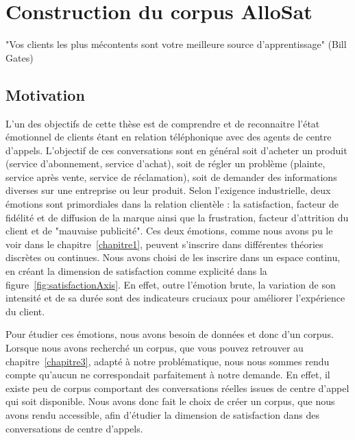 \chapter{Construction du corpus AlloSat}
\label{chapitre4}
"Vos clients les plus mécontents sont votre meilleure source d’apprentissage" (Bill Gates)

\section{Motivation}
L'un des objectifs de cette thèse est de comprendre et de reconnaitre l'état émotionnel de clients étant en relation téléphonique avec des agents de centre d'appels. L'objectif de ces conversations sont en général soit d'acheter un produit (service d'abonnement, service d'achat), soit de régler un problème (plainte, service après vente, service de réclamation), soit de demander des informations diverses sur une entreprise ou leur produit. Selon l'exigence industrielle, deux émotions sont primordiales dans la relation clientèle : la satisfaction, facteur de fidélité et de diffusion de la marque ainsi que la frustration, facteur d'attrition du client et de "mauvaise publicité". Ces deux émotions, comme nous avons pu le voir dans le chapitre~\ref{chapitre1}, peuvent s'inscrire dans différentes théories discrètes ou continues.
Nous avons choisi de les inscrire dans un espace continu, en créant la dimension de satisfaction comme explicité dans la figure~\ref{fig:satisfactionAxis}. En effet, outre l'émotion brute, la variation de son intensité et de sa durée sont des indicateurs cruciaux pour améliorer l'expérience du client.

Pour étudier ces émotions, nous avons besoin de données et donc d'un corpus.
Lorsque nous avons recherché un corpus, que vous pouvez retrouver au chapitre~\ref{chapitre3}, adapté à notre problématique, nous nous sommes rendu compte qu'aucun ne correspondait parfaitement à notre demande.
En effet, il existe peu de corpus comportant des conversations réelles issues de centre d'appel qui soit disponible. Nous avons donc fait le choix de créer un corpus, que nous avons rendu accessible, afin d'étudier la dimension de satisfaction dans des conversations de centre d'appels.


